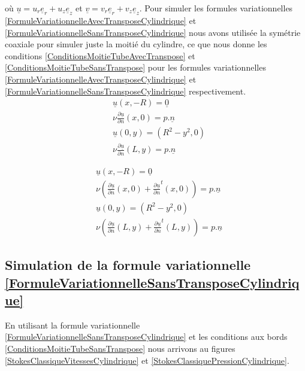 \documentclass[11pt,a4paper]{article}
\numberwithin{equation}{subsection}
\numberwithin{figure}{subsection}
\begin{document}
où $\underline{u} = u_r\underline{e}_r + u_z\underline{e}_z$ et $\underline{v} = v_r\underline{e}_r + v_z\underline{e}_z$. Pour simuler les formules variationnelles \ref{FormuleVariationnelleAvecTransposeCylindrique} et \ref{FormuleVariationnelleSansTransposeCylindrique} nous avons utilisée la symétrie coaxiale pour simuler juste la moitié du cylindre, ce que nous donne les conditions \ref{ConditionsMoitieTubeAvecTranspose} et \ref{ConditionsMoitieTubeSansTranspose} pour les formules variationnelles \ref{FormuleVariationnelleAvecTransposeCylindrique} et \ref{FormuleVariationnelleSansTransposeCylindrique} respectivement.
\begin{equation}
\begin{aligned}
& \underline{u}(x,-R) = \underline{0} \\
& \nu\frac{\partial\underline{u}}{\partial n}(x,0) = p.\underline{n} \\
& \underline{u}(0,y) = \left(R^2 - y^2, 0\right) \\
& \nu\frac{\partial\underline{u}}{\partial n}(L,y) = p.\underline{n}
\end{aligned} \label{ConditionsMoitieTubeSansTranspose}
\end{equation}

\begin{equation}
\begin{aligned}
& \underline{u}(x,-R) = \underline{0} \\
& \nu\left(\frac{\partial\underline{u}}{\partial n}(x,0) + \frac{\partial\underline{u}}{\partial n}^t(x,0)\right) = p.\underline{n} \\
& \underline{u}(0,y) = \left(R^2 - y^2, 0\right) \\
& \nu\left(\frac{\partial\underline{u}}{\partial n}(L,y) + \frac{\partial\underline{u}}{\partial n}^t(L,y)\right) = p.\underline{n}
\end{aligned} \label{ConditionsMoitieTubeAvecTranspose}
\end{equation}

\subsection{Simulation de la formule variationnelle \ref{FormuleVariationnelleSansTransposeCylindrique}}

En utilisant la formule variationnelle \ref{FormuleVariationnelleSansTransposeCylindrique} et les conditions aux bords \ref{ConditionsMoitieTubeSansTranspose} nous arrivons au figures \ref{StokesClassiqueVitessesCylindrique} et \ref{StokesClassiquePressionCylindrique}.
\end{document}
